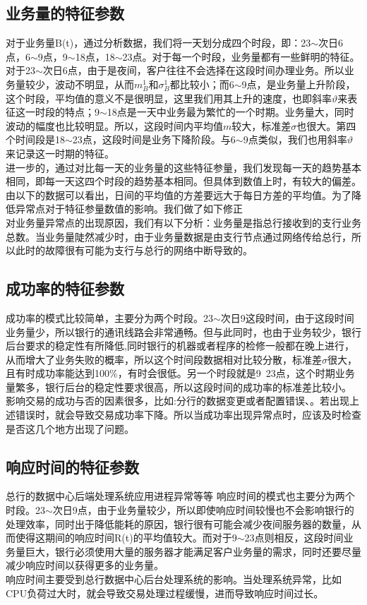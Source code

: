 \documentclass[a4paper]{article}
\begin{document}
\subsection{业务量的特征参数}
\indent 对于业务量B(t)，通过分析数据，我们将一天划分成四个时段，即：23$\sim$次日6点，6$\sim$9点，9$\sim$18点，18$\sim$23点。对于每一个时段，业务量都有一些鲜明的特征。对于23$\sim$次日6点，由于是夜间，客户往往不会选择在这段时间办理业务。所以业务量较少，波动不明显，从而$m_B^1$和$\sigma_B^1$都比较小；而6$\sim$9点，是业务量上升阶段，这个时段，平均值的意义不是很明显，这里我们用其上升的速度，也即斜率$\vartheta$来表征这一时段的特点；9$\sim$18点是一天中业务最为繁忙的一个时期。业务量大，同时波动的幅度也比较明显。所以，这段时间内平均值$m$较大，标准差$\sigma$也很大。第四个时间段是18$\sim$23点，这段时间是业务下降阶段。与6$\sim$9点类似，我们也用斜率$\vartheta$来记录这一时期的特征。 \\
\indent 进一步的，通过对比每一天的业务量的这些特征参量，我们发现每一天的趋势基本相同，即每一天这四个时段的趋势基本相同。但具体到数值上时，有较大的偏差。由以下的数据可以看出，日间的平均值的方差要远大于每日方差的平均值。为了降低异常点对于特征参量数值的影响。我们做了如下修正  \\
\indent 对业务量异常点的出现原因，我们有以下分析：业务量是指总行接收到的支行业务总数。当业务量陡然减少时，由于业务量数据是由支行节点通过网络传给总行，所以此时的故障很有可能为支行与总行的网络中断导致的。
\subsection{成功率的特征参数}
\indent 成功率的模式比较简单，主要分为两个时段。23$\sim$次日9这段时间，由于这段时间业务量少，所以银行的通讯线路会非常通畅。但与此同时，也由于业务较少，银行后台要求的稳定性有所降低,同时银行的机器或者程序的检修一般都在晚上进行，从而增大了业务失败的概率，所以这个时间段数据相对比较分散，标准差$\sigma$很大，且有时成功率能达到100\%，有时会很低。另一个时段就是9~23点，这个时期业务量繁多，银行后台的稳定性要求很高，所以这段时间的成功率的标准差比较小。 \\
\indent 影响交易的成功与否的因素很多，比如:分行的数据变更或者配置错误、。若出现上述错误时，就会导致交易成功率下降。所以当成功率出现异常点时，应该及时检查是否这几个地方出现了问题。
\subsection{响应时间的特征参数}总行的数据中心后端处理系统应用进程异常等等
\indent 响应时间的模式也主要分为两个时段。23$\sim$次日9点，由于业务量较少，所以即使响应时间较慢也不会影响银行的处理效率，同时出于降低能耗的原因，银行很有可能会减少夜间服务器的数量，从而使得这期间的响应时间R(t)的平均值较大。而对于9$\sim$23点则相反，这段时间业务量巨大，银行必须使用大量的服务器才能满足客户业务量的需求，同时还要尽量减少响应时间以获得更多的业务量。 \\
\indent 响应时间主要受到总行数据中心后台处理系统的影响。当处理系统异常，比如CPU负荷过大时，就会导致交易处理过程缓慢，进而导致响应时间过长。
\end{document}
